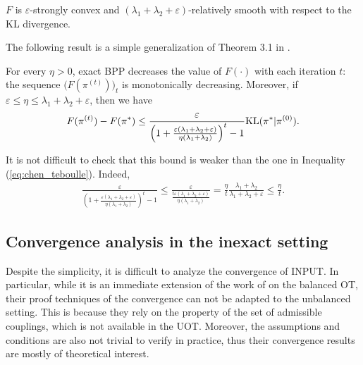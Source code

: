 \begin{lemma}
  \label{lemma:convex-smoothness}
  $F$ is $\varepsilon$-strongly convex and $(\lambda_1 + \lambda_2 + \varepsilon)$-relatively smooth
  with respect to the KL divergence.
\end{lemma}
The following result is a simple generalization of Theorem 3.1 in \citep{Lu18}.
\begin{proposition}
  \label{prop:convergence-exact-sppa}
  For every $\eta > 0$, exact BPP decreases the value of $F(\cdot)$ with each iteration $t$:
  the sequence $\big( F(\pi^{(t)}) \big)_t$ is monotonically decreasing.
  Moreover, if $\varepsilon \leq \eta \leq \lambda_1 + \lambda_2 + \varepsilon$,
  then we have
  \begin{align*}
    F(\pi^{(t)}) - F(\pi^*)
    \leq \frac{\varepsilon}{\left( 1 +
    \frac{\varepsilon (\lambda_1 + \lambda_2 + \varepsilon)}{\eta (\lambda_1 + \lambda_2)} \right)^t - 1}
    \text{KL}(\pi^* | \pi^{(0)}).
  \end{align*}
\end{proposition}
It is not difficult to check that this bound is weaker than the one in
Inequality (\ref{eq:chen_teboulle}). Indeed,
\begin{align*}
  \frac{\varepsilon}{\left( 1 +
  \frac{\varepsilon (\lambda_1 + \lambda_2 + \varepsilon)}{\eta (\lambda_1 + \lambda_2)} \right)^t - 1}
  \leq \frac{\varepsilon}{\frac{t \varepsilon(\lambda_1 + \lambda_2 + \varepsilon)}{\eta (\lambda_1 + \lambda_2)}}
  = \frac{\eta}{t} \frac{\lambda_1 + \lambda_2}{\lambda_1 + \lambda_2 + \varepsilon}
  \leq \frac{\eta}{t}.
\end{align*}

\subsection{Convergence analysis in the inexact setting}

Despite the simplicity, it is difficult to analyze the convergence of INPUT.
In particular, while it is an immediate extension of the work of \citep{Xie20} on the balanced OT,
their proof techniques of the convergence can not be adapted to the unbalanced setting.
This is because they rely on the property of the set of admissible couplings,
which is not available in the UOT. Moreover, the assumptions and conditions are also
not trivial to verify in practice, thus their convergence results are mostly of theoretical interest.

